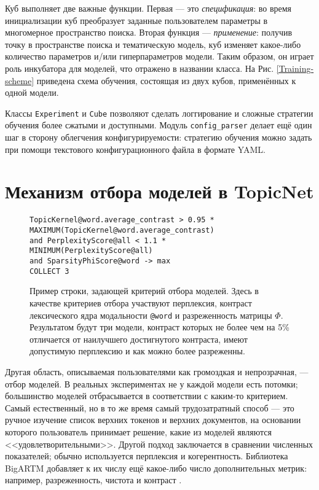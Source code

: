 Куб выполняет две важные функции. Первая --- это \textit{спецификация}: во время инициализации куб преобразует заданные пользователем параметры в многомерное пространство поиска. Вторая функция --- \textit{применение}: получив точку в пространстве поиска и тематическую модель, куб изменяет какое-либо количество параметров и/или гиперпараметров модели. Таким образом, он играет роль инкубатора для моделей, что отражено в названии класса. На Рис.  \ref{Training-scheme} приведена схема обучения, состоящая из двух кубов, применённых к одной модели.  

Классы \texttt{Experiment} и \texttt{Cube} позволяют сделать логгирование и сложные стратегии обучения более сжатыми и доступными. Модуль \texttt{config\_parser} делает ещё один шаг в сторону облегчения конфигурируемости: стратегию обучения можно задать при помощи текстового конфигурационного файла в формате YAML.  

\section{Механизм отбора моделей в TopicNet} 

\begin{figure*}[!ht]
\footnotesize
\texttt{TopicKernel@word.average\_contrast > 0.95 * MAXIMUM(TopicKernel@word.average\_contrast) \\
\hphantom{\ \ } and PerplexityScore@all < 1.1 * MINIMUM(PerplexityScore@all) \\
\hphantom{\ \ } and SparsityPhiScore@word -> max\\
\hphantom{\ \ } COLLECT 3}
\caption{Пример строки, задающей критерий отбора моделей. Здесь в качестве критериев отбора участвуют перплексия, контраст лексического ядра модальности \texttt{@word} и разреженность матрицы $\Phi$. Результатом будут три модели, контраст которых не более чем на 5\% отличается от наилучшего достигнутого контраста, имеют допустимую перплексию и как можно более разреженны.}
\label{DSL-example}
\end{figure*} 

Другая область, описываемая пользователями как громоздкая и непрозрачная, --- отбор моделей. В реальных экспериментах не у каждой модели есть потомки; большинство моделей отбрасывается в соответствии с каким-то критерием. Самый естественный, но в то же время самый трудозатратный способ --- это ручное изучение список верхних токенов и верхних документов, на основании которого пользователь принимает решение, какие из моделей являются <<удовлетворительными>>. Другой подход заключается в сравнении численных показателей; обычно используется перплексия и когерентность. Библиотека \mbox{BigARTM} добавляет к их числу ещё какое-либо число дополнительных метрик: например, разреженность, чистота и контраст \cite{voron15mlj}.  

